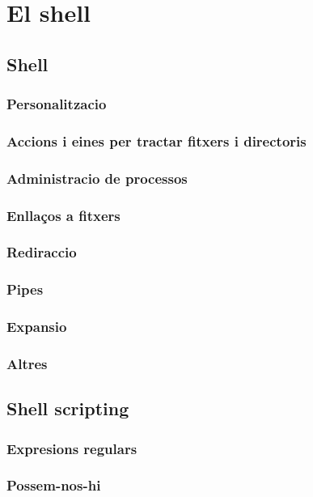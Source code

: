\section{El shell}
\subsection{Shell}

\subsubsection{Personalitzacio}

\subsubsection{Accions i eines per tractar fitxers i directoris}

\subsubsection{Administracio de processos}

\subsubsection{Enllaços a fitxers}

\subsubsection{Rediraccio}

\subsubsection{Pipes}

\subsubsection{Expansio}

\subsubsection{Altres}

\subsection{Shell scripting}

\subsubsection{Expresions regulars}

\subsubsection{Possem-nos-hi}
